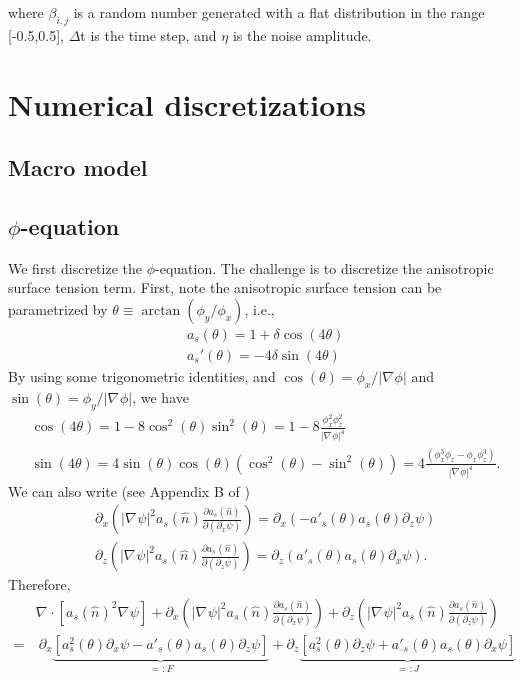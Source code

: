 \documentclass[a4paper,12pt]{article}
\renewcommand{\div}[1]{\nabla_{#1} \cdot}
\newcommand{\grad}[1]{\nabla_{#1}}
\begin{document}
where $\beta_{i,j}$ is a random number generated with a flat distribution in the range [-0.5,0.5], $\Delta$t is the time step, and $\eta$ is the noise amplitude.


\section{Numerical discretizations}

\subsection{Macro model}

\subsection{$\phi$-equation}
We first discretize the $\phi$-equation. The challenge is to discretize the anisotropic surface tension term. First, note the anisotropic surface tension can be parametrized by $\theta \equiv \arctan(\phi_y / \phi_x)$, i.e., 
\begin{align}
& a_s(\theta)=  1 + \delta \cos(4 \theta) \\
& a_s'(\theta) = -4 \delta \sin(4\theta) 
\end{align}
By using some trigonometric identities, and $\cos(\theta) = \phi_x / |\grad{} \phi|$ and  $\sin(\theta) = \phi_y / |\grad{} \phi|$, we have
\begin{align}
& \cos(4\theta) = 1-8\cos^2(\theta) \sin^2(\theta) = 1- 8 \frac{ \phi_x^2 \phi_z^2 }{|\grad{} \phi|^4} \\
& \sin(4\theta) = 4 \sin(\theta) \cos(\theta) ( \cos^2(\theta) - \sin^2(\theta)) = 4 \frac{(\phi_x^3 \phi_z - \phi_x \phi_z^3 )}{|\grad{} \phi|^4}.
\end{align}
We can also write (see Appendix B of \cite{Tourret2015})
\begin{align}
& \partial_x \left( |\grad{} \psi|^2 a_s(\hat{n}) \frac{\partial a_s(\hat{n})}{\partial (\partial_x \psi)}  \right) = \partial_x (-a'_s(\theta) a_s(\theta) \partial_z \psi ) \\
& \partial_z \left( |\grad{} \psi|^2 a_s(\hat{n}) \frac{\partial a_s(\hat{n})}{\partial (\partial_z \psi)}  \right) = 
\partial_z (a'_s(\theta) a_s(\theta) \partial_x \psi).
\end{align}
Therefore,
\begin{align}
 & \div{} [a_s(\hat{n})^2 \grad{} \psi] +  \partial_x \left( |\grad{} \psi|^2 a_s(\hat{n}) \frac{\partial a_s(\hat{n})}{\partial (\partial_x \psi)}  \right)  +
\partial_z \left( |\grad{} \psi|^2 a_s(\hat{n}) \frac{\partial a_s(\hat{n})}{\partial (\partial_z \psi)}  \right) \nonumber \\
= &  \  \partial_x  \underbrace{ \left[ a_s^2(\theta) \partial_x \psi - a'_s(\theta) a_s(\theta) \partial_z \psi \right]}_{=: F} + 
\partial_z \underbrace{ \left[ a_s^2(\theta) \partial_z \psi + a'_s(\theta) a_s(\theta) \partial_x \psi \right]}_{=: J}  
\label{eq:aniso_surf2}
\end{align}
\end{document}
